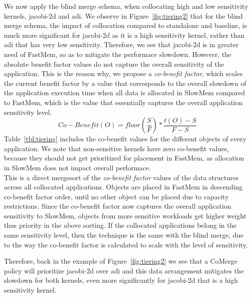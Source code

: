 We now apply the blind merge schema, when collocating high and low sensitivity kernels, jacobi-2d and adi.  We observe in Figure~\ref{fig:tiering2} that for the blind merge schema, the impact of collocation compared to standalone and baseline, is much more significant for jacobi-2d as it is a high sensitivity kernel, 
rather than adi that has very low sensitivity. Therefore, we see that jacobi-2d is in greater need of FastMem, so as to mitigate the performace slowdown. 
However, the absolute benefit factor values do not capture the overall sensitivity of the application. This is the reason why, we propose a {\it co-benefit factor}, which scales the current benefit factor by a value that 
corresponds to the overall slowdown of the application execution time when all data is allocated in SlowMem compared to FastMem, which is the value that essentially captures the overall application sensitivity level. 
\[Co-Benefit(O) = floor(\frac{S}{F})*\frac{t(O)-S}{F-S}\]
Table~\ref{tbl:tiering} includes the co-benefit values for the different objects of every application. We note that non-sensitive kernels have zero co-benefit values, because they should not get prioritized for placement in FastMem, 
as allocation in SlowMem does not impact overall performace. \\

 This is a direct mergesort of the {\it co-benefit factor} values of the data structures across all collocated applications. Objects are placed in FastMem in descending co-benefit factor order, until no other object can be placed due to capacity restrictions. 
Since the co-benefit factor now captures the overall application sensitivity to SlowMem, objects from more sensitive workloads get higher weight thus priority in the above sorting.
 If the collocated applications belong in the same sensitivity level, then the technique is the same with the blind merge, due to the way the co-benefit factor is calculated to scale with the level of sensitivity. 
 
Therefore, back in the example of Figure~\ref{fig:tiering2} we see that a CoMerge policy will prioritize jacobi-2d over adi and this data arrangement mitigates the 
slowdown for both kernels, even more significantly for jacobi-2d that is a high sensitivity kernel. \\

\vspace{0.8ex}
\vspace{0.3ex} 

